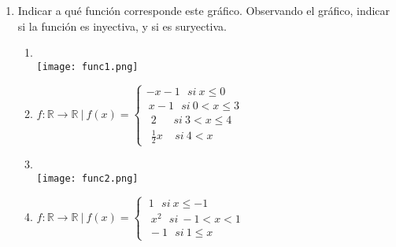 \documentclass[a4paper]{article}
\newcommand{\answer}{\item[**]}
\newcommand{\exercise}{\item}
\begin{document}
\begin{enumerate}
\begin{multicols}{2}
\begin{enumerate} [label=(\alph*)]
		\item $\left\{\begin{matrix}2x-1 ~~~~ si ~~x\leq 1\\ ~~x^2~~ ~~~~~ si ~~x>1\end{matrix}\right.$
		\item $\left\{\begin{matrix}-x ~~~~ si ~~x\leq 0~~~\\ ~~~~x  ~~~~  si ~~0<x\leq 3 \\ -x ~~~~ si ~~x>3~~~\end{matrix}\right.$
		\item $\left\{\begin{matrix}\hspace{-2mm}3x-2 ~~~ si ~~x\leq 2 ~~\\ \hspace{-2mm} ~~~~~ x^2 ~~~~~~  si ~~2<x\leq 3 \\ \hspace{-2mm}\displaystyle{\frac{x+6}{9}} ~~~ si ~~x>3 ~~\end{matrix}\right.$
		\item $\left\{\begin{matrix}x^2+7 ~~~~ si ~~x\leq 2\\ x+4 ~~~~~ si ~~x>2\end{matrix}\right.$

	\end{enumerate}
	\end{multicols}

	\newpage
	\exercise Indicar a qué función corresponde este gráfico. Observando el gráfico, indicar si la función es inyectiva, y si es suryectiva.
	\begin{multicols}{2}
	\begin{enumerate} [label=(\alph*)]
		\item ~\\ [-12pt] \texttt{[image: func1.png]} \vfill
		\answer $f: \mathbb{R} \to \mathbb{R} ~|~ f(x)=\left\{\begin{matrix}-x-1 ~~~si~ x\leq0~~~~~\\~x-1 ~~~si~ 0<x\leq 3 \\ ~~2~~ ~~~~~si~ 3<x\leq4 \\ ~~\frac{1}{2}x~~ ~~~si~ 4<x~~~~~ \end{matrix}\right.$

		\item ~\\ [-12pt] \texttt{[image: func2.png]} \vfill
		\answer $f: \mathbb{R} \to \mathbb{R} ~|~ f(x)=\left\{\begin{matrix}~1 ~~~si~ x\leq-1~~~~~\\~~x^2 ~~~si~ -1<x< 1 \\ ~-1 ~~~si~ 1\leq x ~~~~~~~\end{matrix}\right.$


\end{enumerate}
\end{multicols}
\end{enumerate}
\end{document}
